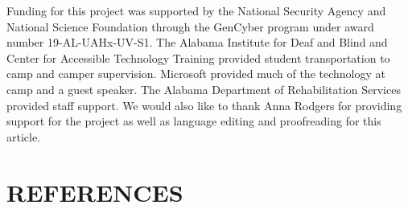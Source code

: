 \documentclass[11.5pt]{sig-alternate} %
\begin{document}
\begin{large}
Funding for this project was supported by the National Security Agency and National Science Foundation through the GenCyber program under award number 19-AL-UAHx-UV-S1. The Alabama Institute for Deaf and Blind and Center for Accessible Technology Training provided student transportation to camp and camper supervision. Microsoft provided much of the technology at camp and a guest speaker. The Alabama Department of Rehabilitation Services provided staff support. We would also like to thank Anna Rodgers for providing support for the project as well as language editing and proofreading for this article. 

\end{large}
 
\section*{REFERENCES}\par 
\end{document}
